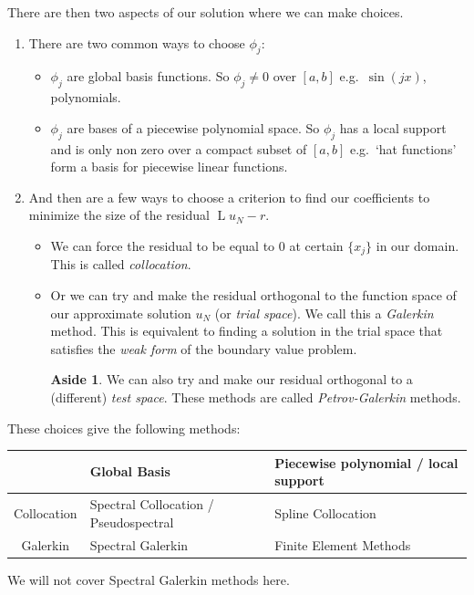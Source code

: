 \documentclass[12pt, a4paper]{article}
\theoremstyle{definition}
\newtheorem*{aside}{Aside}
\theoremstyle{remark}
\numberwithin{equation}{section}
\begin{document}
There are then two aspects of our solution where we can make choices.
\begin{enumerate}
\item There are two common ways to choose $\phi_j$:
\begin{itemize}
\item $\phi_j$ are global basis functions. So $\phi_j \neq 0$ over  $[a,b]$ e.g.\ $\sin(jx)$, polynomials.
\item $\phi_j$ are bases of a piecewise polynomial space. So $\phi_j$ has a local support and is only non zero over a compact subset of $[a,b]$ e.g.\ `hat functions' form a basis for piecewise linear functions.
\end{itemize}

\item And then are a few ways to choose a criterion to find our coefficients to minimize the size of the residual $\operatorname{L}u_N-r$.
\begin{itemize}
\item We can force the residual to be equal to 0 at certain $\{x_j\}$ in our domain. This is called \emph{collocation}. 
\item Or we can try and make the residual orthogonal to the function space of our approximate solution $u_N$ (or \emph{trial space}). We call this a \emph{Galerkin} method. This is equivalent to finding a solution in  the trial space that satisfies the \emph{weak form} of the boundary value problem.

\newpage
 \begin{aside}We can also try and make our residual orthogonal to a (different) \emph{test space}. These methods are called \emph{Petrov-Galerkin} methods.
 \end{aside}
  \end{itemize}
\end{enumerate}
These choices give the following methods:
\begin{center}
\begin{tabular}{c|>{\centering}m{4cm}<{\centering}|>{\centering}p{4cm}<{\centering}}
 &Global Basis & Piecewise polynomial / local support \tabularnewline \hline 
 Collocation &\small Spectral Collocation / Pseudospectral & \small Spline Collocation \tabularnewline  \hline
Galerkin & \small Spectral Galerkin & \small Finite Element Methods\tabularnewline 
\end{tabular}
\end{center}

We will not cover Spectral Galerkin methods here.
\end{document}
